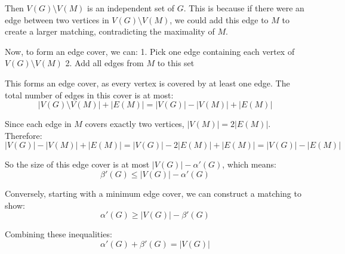 \documentclass{article}
\theoremstyle{definition}
\begin{document}
Then $V(G) \setminus V(M)$ is an independent set of $G$. This is because if there were an edge between two vertices in $V(G) \setminus V(M)$, we could add this edge to $M$ to create a larger matching, contradicting the maximality of $M$.

Now, to form an edge cover, we can:
1. Pick one edge containing each vertex of $V(G) \setminus V(M)$
2. Add all edges from $M$ to this set

This forms an edge cover, as every vertex is covered by at least one edge. The total number of edges in this cover is at most:
\begin{equation}
|V(G) \setminus V(M)| + |E(M)| = |V(G)| - |V(M)| + |E(M)|
\end{equation}

Since each edge in $M$ covers exactly two vertices, $|V(M)| = 2|E(M)|$. Therefore:
\begin{equation}
|V(G)| - |V(M)| + |E(M)| = |V(G)| - 2|E(M)| + |E(M)| = |V(G)| - |E(M)|
\end{equation}

So the size of this edge cover is at most $|V(G)| - \alpha'(G)$, which means:
\begin{equation}
\beta'(G) \leq |V(G)| - \alpha'(G)
\end{equation}

Conversely, starting with a minimum edge cover, we can construct a matching to show:
\begin{equation}
\alpha'(G) \geq |V(G)| - \beta'(G)
\end{equation}

Combining these inequalities:
\begin{equation}
\alpha'(G) + \beta'(G) = |V(G)|
\end{equation}
\end{document}
